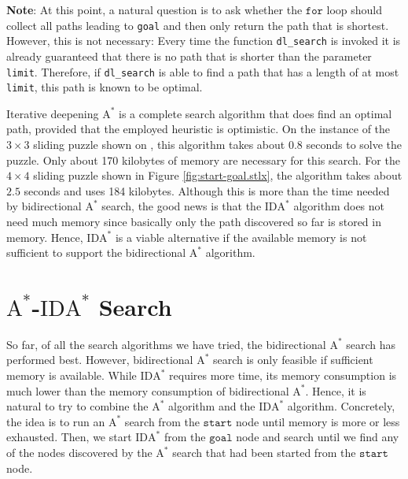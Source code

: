 \begin{enumerate}
      \textbf{Note}: At this point, a natural question is to ask whether the $\texttt{for}$ loop should collect
      all paths leading to \texttt{goal} and then only return the path that is shortest.  However, this is
      not necessary:  Every time the function \texttt{dl\_search} is invoked it is already guaranteed that there
      is no path that is shorter than the parameter \texttt{limit}.  Therefore, if \texttt{dl\_search} is able
      to find a path that has a length of at most \texttt{limit}, this path is known to be optimal.
\end{enumerate}
Iterative deepening $\mathrm{A}^*$ is a complete search algorithm that does find an optimal path, provided that the employed heuristic
is optimistic.  On the instance of the $3 \times 3$ sliding puzzle shown on , this
algorithm takes about $0.8$ seconds to solve the puzzle.  Only about 170 kilobytes of memory are necessary for
this search.  For the $4 \times 4$ sliding puzzle shown in Figure
\ref{fig:start-goal.stlx}, the algorithm 
takes about $2.5$ seconds and uses 184 kilobytes.  Although this is more than the time needed by bidirectional $\mathrm{A}^*$ search,
the good news is that the $\mathrm{IDA}^*$ algorithm does not need much memory since basically only the path
discovered so far is stored in memory.  Hence, $\mathrm{IDA}^*$ is a viable alternative if the available memory
is not sufficient to support the bidirectional $\mathrm{A}^*$ algorithm.

\section{$\mathrm{A}^*$-$\mathrm{IDA}^*$ Search}
So far, of all the search algorithms we have tried, the bidirectional $\mathrm{A}^*$ search has performed best.  However,
bidirectional $\mathrm{A}^*$ search is only feasible if sufficient memory is available.   While
$\mathrm{IDA}^*$ requires more time, its memory consumption is much lower than the memory consumption of
bidirectional $\mathrm{A}^*$.  Hence, it is natural to try to combine the $\mathrm{A}^*$ algorithm and the
$\mathrm{IDA}^*$ algorithm.  Concretely, the
idea is to run an $\mathrm{A}^*$ search from the $\texttt{start}$ node until memory is more or less
exhausted.  Then, we start $\mathrm{IDA}^*$ from the $\texttt{goal}$ node and search until we find any of the
nodes discovered by the $\mathrm{A}^*$ search that had been started from the $\texttt{start}$ node.


